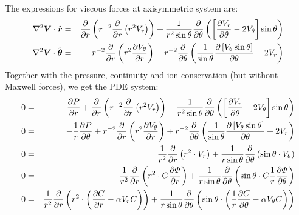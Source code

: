 The expressions for viscous forces at axisymmetric system are:
\begin{eqnarray}
\nabla^2 \boldsymbol{V} \cdot \hat{\boldsymbol{r}} &=&
 \frac{\partial }{\partial r} \left(r^{-2}\frac{\partial }{\partial r}\left(r^2 V_r\right)
 \right)
 + \frac{1}{r^2 \sin\theta} \frac{\partial }{\partial \theta}
 \left( \left[\frac{\partial V_r}{\partial \theta} - 2 V_\theta \right] \sin\theta \right)
\\
\nabla^2 \boldsymbol{V} \cdot \hat{\boldsymbol{\theta}} &=& r^{-2}
\frac{\partial }{\partial r}\left( r^2 \frac{\partial V_\theta}{\partial r} \right)
+ r^{-2} \frac{\partial }{\partial \theta} \left( \frac{1}{\sin\theta}
\frac{\partial \left[V_\theta \sin\theta\right]}{\partial \theta}
+ 2V_r \right)
\end{eqnarray}
Together with the pressure, continuity and ion conservation (but without Maxwell forces), 
we get the PDE system:
\begin{eqnarray}
0 &=& -\frac{\partial P}{\partial r} + \frac{\partial }{\partial r} \left(r^{-2}\frac{\partial }{\partial r}\left(r^2 V_r\right) \right)
 + \frac{1}{r^2 \sin\theta} \frac{\partial }{\partial \theta}
 \left( \left[\frac{\partial V_r}{\partial \theta} - 2 V_\theta \right] \sin\theta \right)
\\
0 &=& -\frac{1}{r}\frac{\partial P}{\partial \theta} + r^{-2} \frac{\partial }{\partial r}\left( r^2 \frac{\partial V_\theta}{\partial r} \right)
+ r^{-2} \frac{\partial }{\partial \theta} \left( \frac{1}{\sin\theta}
\frac{\partial \left[V_\theta \sin\theta\right]}{\partial \theta}
+ 2V_r \right)
\\
0 &=& \frac{1}{r^2}\frac{\partial }{\partial r} \left( r^2 \cdot V_r\right)
  + \frac{1}{r \sin\theta} \frac{\partial }{\partial \theta} \left( \sin\theta \cdot V_\theta\right)
\\
0 &=& \frac{1}{r^2}\frac{\partial }{\partial r} \left( r^2 \cdot C \frac{\partial \varPhi}{\partial r}\right)
  + \frac{1}{r \sin\theta} \frac{\partial }{\partial \theta} \left( \sin\theta \cdot C \frac{1}{r}\frac{\partial \varPhi}{\partial \theta}\right)
\\
0 &=& \frac{1}{r^2}\frac{\partial }{\partial r} \left( r^2 \cdot 
  \left(\frac{\partial C}{\partial r} - \alpha V_r C\right)\right)
  + \frac{1}{r \sin\theta} \frac{\partial }{\partial \theta} \left( \sin\theta \cdot 
  \left(\frac{1}{r}\frac{\partial C}{\partial \theta} - \alpha V_\theta C\right)\right)
\end{eqnarray}
